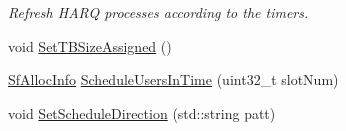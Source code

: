 \begin{DoxyCompactItemize}
\begin{DoxyCompactList}\small\item\em Refresh H\+A\+RQ processes according to the timers. \end{DoxyCompactList}\item 
void \hyperlink{classns3_1_1MmWaveRrMacScheduler_ac0c71520f7ed311a0d99dfed182faf66}{Set\+T\+B\+Size\+Assigned} ()
\item 
\hyperlink{structns3_1_1SfAllocInfo}{Sf\+Alloc\+Info} \hyperlink{classns3_1_1MmWaveRrMacScheduler_aa81369a8badc00db9ad5259cadec7e82}{Schedule\+Users\+In\+Time} (uint32\+\_\+t slot\+Num)
\item 
void \hyperlink{classns3_1_1MmWaveRrMacScheduler_a3c009919ec557272944849b0da580c10}{Set\+Schedule\+Direction} (std\+::string patt)
\end{DoxyCompactItemize}
